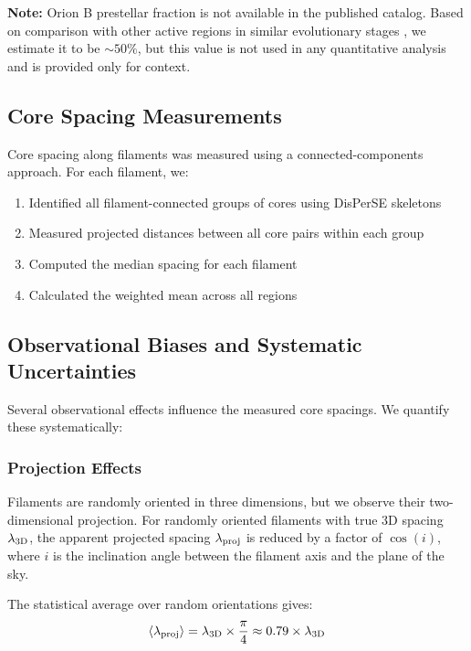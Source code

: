 \documentclass[11pt,a4paper]{article}
\begin{document}
\noindent\textbf{Note:} Orion B prestellar fraction is not available in the published catalog. Based on comparison with other active regions in similar evolutionary stages \citep{Andre2014}, we estimate it to be $\sim50\%$, but this value is not used in any quantitative analysis and is provided only for context.

\subsection{Core Spacing Measurements}

Core spacing along filaments was measured using a connected-components approach. For each filament, we:
\begin{enumerate}
    \item Identified all filament-connected groups of cores using DisPerSE skeletons
    \item Measured projected distances between all core pairs within each group
    \item Computed the median spacing for each filament
    \item Calculated the weighted mean across all regions
\end{enumerate}

\subsection{Observational Biases and Systematic Uncertainties}

Several observational effects influence the measured core spacings. We quantify these systematically:

\subsubsection{Projection Effects}
Filaments are randomly oriented in three dimensions, but we observe their two-dimensional projection. For randomly oriented filaments with true 3D spacing $\lambda_{\rm 3D}$, the apparent projected spacing $\lambda_{\rm proj}$ is reduced by a factor of $\cos(i)$, where $i$ is the inclination angle between the filament axis and the plane of the sky.

The statistical average over random orientations gives:
\begin{equation}
\langle \lambda_{\rm proj} \rangle = \lambda_{\rm 3D} \times \frac{\pi}{4} \approx 0.79 \times \lambda_{\rm 3D}
\end{equation}
\end{document}
